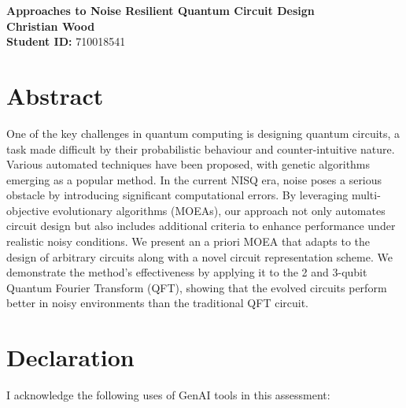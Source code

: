 \documentclass[11pt,a4paper]{article}
\begin{document}
\singlespacing  %
\thispagestyle{empty} %

\begin{center}
{\bf \LARGE Approaches to Noise Resilient Quantum Circuit Design}\\[0.5cm]
    \textbf{Christian Wood} \\[0.2cm]
    \textbf{Student ID:} 710018541 \\[1cm]
\end{center}

\section*{Abstract}

\noindent 
One of the key challenges in quantum computing is designing quantum circuits, a task made difficult by their probabilistic behaviour and counter-intuitive nature. Various automated techniques have been proposed, with genetic algorithms emerging as a popular method. In the current NISQ era, noise poses a serious obstacle by introducing significant computational errors. By leveraging multi-objective evolutionary algorithms (MOEAs), our approach not only automates circuit design but also includes additional criteria to enhance performance under realistic noisy conditions. We present an a priori MOEA that adapts to the design of arbitrary circuits along with a novel circuit representation scheme. We demonstrate the method’s effectiveness by applying it to the 2 and 3-qubit Quantum Fourier Transform (QFT), showing that the evolved circuits perform better in noisy environments than the traditional QFT circuit.

\newpage
\thispagestyle{empty} 
\section*{Declaration}
I acknowledge the following uses of GenAI tools in this assessment: 
\end{document}
